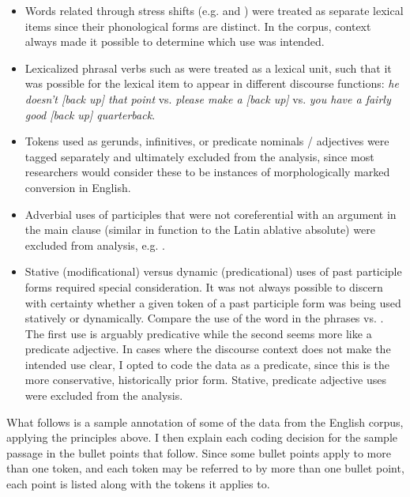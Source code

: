 \begin{itemize}

  \singlespacing

  \item Words related through stress shifts (e.g.  and ) were treated as separate lexical items since their phonological forms are distinct. In the corpus, context always made it possible to determine which use was intended.

  \item Lexicalized phrasal verbs such as  were treated as a lexical unit, such that it was possible for the lexical item to appear in different discourse functions: \textit{he doesn't [back up] that point} vs. \textit{please make a [back up]} vs. \textit{you have a fairly good [back up] quarterback}.

  \item Tokens used as gerunds, infinitives, or predicate nominals / adjectives were tagged separately and ultimately excluded from the analysis, since most researchers would consider these to be instances of morphologically marked conversion in English.

  \item Adverbial uses of participles that were not coreferential with an argument in the main clause (similar in function to the Latin ablative absolute) were excluded from analysis, e.g. .

  \item Stative (modificational) versus dynamic (predicational) uses of past participle forms required special consideration. It was not always possible to discern with certainty whether a given token of a past participle form was being used statively or dynamically. Compare the use of the word  in the phrases  vs. . The first use is arguably predicative while the second seems more like a predicate adjective. In cases where the discourse context does not make the intended use clear, I opted to code the data as a predicate, since this is the more conservative, historically prior form. Stative, predicate adjective uses were excluded from the analysis.

\end{itemize}

What follows is a sample annotation of some of the data from the English corpus, applying the principles above. I then explain each coding decision for the sample passage in the bullet points that follow. Since some bullet points apply to more than one token, and each token may be referred to by more than one bullet point, each point is listed along with the tokens it applies to.

